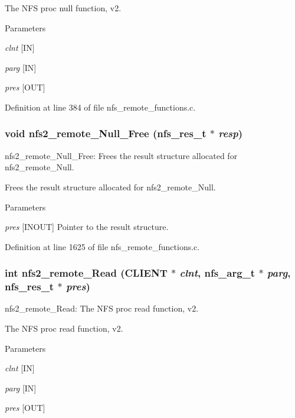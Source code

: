 The NFS proc null function, v2.


\begin{DoxyParams}{Parameters}
\item[{\em clnt}][IN] \item[{\em parg}][IN] \item[{\em pres}][OUT] \end{DoxyParams}


Definition at line 384 of file nfs\_\-remote\_\-functions.c.
\subsubsection[{nfs2\_\-remote\_\-Null\_\-Free}]{\setlength{\rightskip}{0pt plus 5cm}void nfs2\_\-remote\_\-Null\_\-Free (nfs\_\-res\_\-t $\ast$ {\em resp})}\label{group__NFSprocs_gace5aab21fc47e074e47d52bcf8f2457b}
nfs2\_\-remote\_\-Null\_\-Free: Frees the result structure allocated for nfs2\_\-remote\_\-Null.

Frees the result structure allocated for nfs2\_\-remote\_\-Null.


\begin{DoxyParams}{Parameters}
\item[{\em pres}][INOUT] Pointer to the result structure. \end{DoxyParams}


Definition at line 1625 of file nfs\_\-remote\_\-functions.c.
\subsubsection[{nfs2\_\-remote\_\-Read}]{\setlength{\rightskip}{0pt plus 5cm}int nfs2\_\-remote\_\-Read (CLIENT $\ast$ {\em clnt}, \/  nfs\_\-arg\_\-t $\ast$ {\em parg}, \/  nfs\_\-res\_\-t $\ast$ {\em pres})}\label{group__NFSprocs_gaae8a38adaa6d3f96373e48791e285f91}
nfs2\_\-remote\_\-Read: The NFS proc read function, v2.

The NFS proc read function, v2.


\begin{DoxyParams}{Parameters}
\item[{\em clnt}][IN] \item[{\em parg}][IN] \item[{\em pres}][OUT] \end{DoxyParams}


